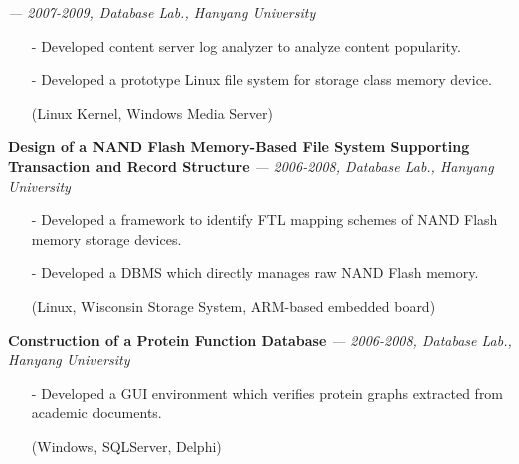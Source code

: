     {\it \footnotesize --- 2007-2009, Database Lab., Hanyang University}
    \begin{itemize}[leftmargin=*]
    \setlength\itemsep{-0.02in}
    \item[-] Developed content server log analyzer to analyze content popularity.
    \item[-] Developed a prototype Linux file system for storage class memory device.
    \item[] {\small(Linux Kernel, Windows Media Server)}
    \end{itemize}
  \vspace{-0.15in}
  {\bf Design of a NAND Flash Memory-Based File System Supporting Transaction and
      Record Structure} 
    {\it \footnotesize --- 2006-2008, Database Lab., Hanyang University}
    \begin{itemize}[leftmargin=*]
    \setlength\itemsep{-0.02in}
    \item[-] Developed a framework to identify FTL mapping schemes of NAND Flash memory
    storage devices.
    \item[-] Developed a DBMS which directly manages raw NAND Flash memory.
    \item[] {\small(Linux, Wisconsin Storage System, ARM-based embedded
     board)}
    \end{itemize}
  \vspace{-0.15in}
  {\bf Construction of a Protein Function Database} 
    {\it \footnotesize --- 2006-2008, Database Lab., Hanyang University}
    \begin{itemize}[leftmargin=*]
    \setlength\itemsep{-0.02in}
    \item[-] Developed a GUI environment which verifies protein graphs extracted
    from academic documents.
    \item[] {\small(Windows, SQLServer, Delphi)}
    \end{itemize}

